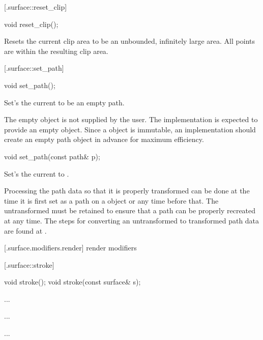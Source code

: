  [\iotwod.surface::reset_clip] {}

%
%
\begin{itemdecl}
void reset_clip();
\end{itemdecl}
\begin{itemdescr}
	\pnum
	\effects
	Resets the current clip area to be an unbounded, infinitely large area. All points are within the resulting clip area.
\end{itemdescr}

 [\iotwod.surface::set_path] {}

%
%
\begin{itemdecl}
void set_path();
\end{itemdecl}
\begin{itemdescr}
	\pnum
	\effects
	Set's the current  to be an empty path.
	
	\pnum
	\realnotes
	The empty  object is not supplied by the user. The implementation is expected to provide an empty  object. Since a  object is immutable, an implementation should create an empty path object in advance for maximum efficiency.
\end{itemdescr}
\begin{itemdecl}
void set_path(const path& p);
\end{itemdecl}
\begin{itemdescr}
	\pnum
	\effects
	Set's the current  to .
	
	\pnum
	\remarks
	Processing the path data so that it is properly transformed can be done at the time it is first set as a path on a  object or any time before that. The untransformed  must be retained to ensure that a path can be properly recreated at any time. The steps for converting an untransformed  to transformed path data are found at .
\end{itemdescr}

 [\iotwod.surface.modifiers.render] { render modifiers}

 [\iotwod.surface::stroke] {}

%
%
\begin{itemdecl}
void stroke();
void stroke(const surface& s);
\end{itemdecl}
\begin{itemdescr}
	\pnum
	\effects
	...
	
	\pnum
	\postconditions
	...
	
	\pnum
	\complexity
	...
	
\end{itemdescr}


